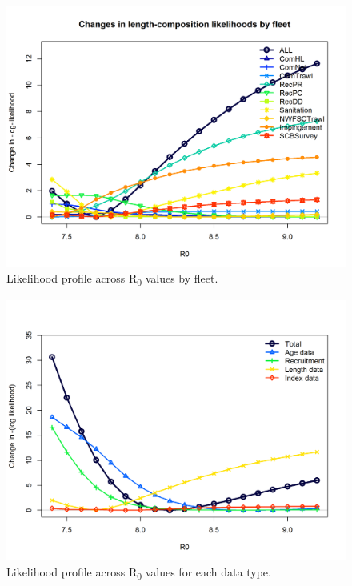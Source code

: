 \documentclass[12pt,]{article}
\begin{document}
\begin{figure}[htbp]
\centering
\includegraphics{Figures/profile_R0_piner.png}
\caption{Likelihood profile across R\textsubscript{0} values by fleet.
\label{fig:profile_R0_piner}}
\end{figure}

\begin{figure}[htbp]
\centering
\includegraphics{Figures/profile_R0_like.png}
\caption{Likelihood profile across R\textsubscript{0} values for each
data type. \label{fig:profile_R0_like}}
\end{figure}
\end{document}

